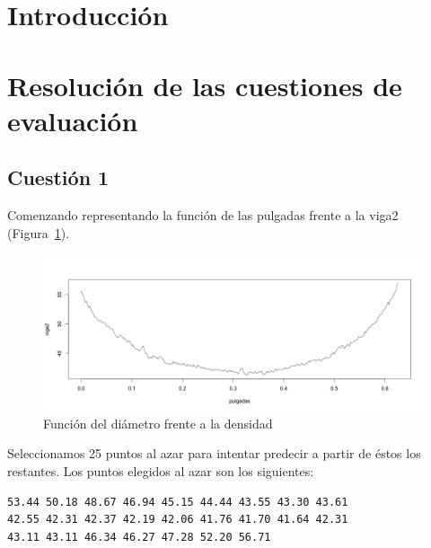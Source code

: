 \documentclass[12pt,a4paper,twoside,openright,titlepage,final]{article}
\author{José Ignacio Escribano}
\title{}
\begin{document}
\setcounter{page}{1}


\listoffigures
\thispagestyle{empty}
\newpage

\listoftables
\thispagestyle{empty}
\newpage

\tableofcontents
\thispagestyle{empty}
\newpage


\setcounter{page}{1}

\section{Introducción}

\section{Resolución de las cuestiones de evaluación}

\subsection{Cuestión 1}

Comenzando representando la función de las pulgadas frente a la viga2 (Figura~\ref{fig:plot_viga2_inicial}).\\

\begin{figure}
\centering
\includegraphics[width=0.8\linewidth]{imagenes/plot_viga2_inicial}
\caption{Función del diámetro frente a la densidad}
\label{fig:plot_viga2_inicial}
\end{figure}

Seleccionamos 25 puntos al azar para intentar predecir a partir de éstos los restantes. Los puntos elegidos al azar son los siguientes:

\begin{verbatim}
53.44 50.18 48.67 46.94 45.15 44.44 43.55 43.30 43.61 
42.55 42.31 42.37 42.19 42.06 41.76 41.70 41.64 42.31 
43.11 43.11 46.34 46.27 47.28 52.20 56.71
\end{verbatim}
\end{document}

